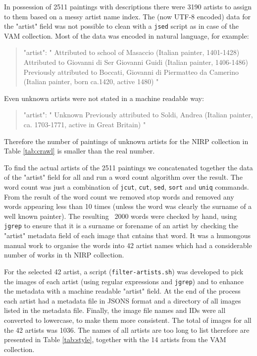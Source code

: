 \documentclass[11pt,a4paper,twoside,openright]{report}
\begin{document}
In possession of 2511 paintings with descriptions there were 3190 artists to
assign to them based on a messy artist name index.  The (now UTF-8 encoded)
data for the "artist" field was not possible to clean with a \texttt{jsed}
script as in case of the VAM collection.  Most of the data was encoded in
natural language, for example:

\begin{quote}
"artist": " Attributed to school of Masaccio (Italian painter, 1401-1428)
Attributed to Giovanni di Ser Giovanni Guidi (Italian painter, 1406-1486)
Previously attributed to Boccati, Giovanni di Piermatteo da Camerino (Italian
painter, born ca.1420, active 1480) "
\end{quote}

Even unknown artists were not stated in a machine readable way:

\begin{quote}
"artist": " Unknown  Previously attributed to Soldi, Andrea (Italian painter,
ca.  1703-1771, active in Great Britain) "
\end{quote}

Therefore the number of paintings of unknown artists for the NIRP collection in
Table \ref{tab:crawl} is smaller than the real number.

To find the actual artists of the 2511 paintings we concatenated together the
data of the "artist" field for all and run a word count algorithm over the
result.  The word count was just a combination of \texttt{jcut}, \texttt{cut},
\texttt{sed}, \texttt{sort} and \texttt{uniq} commands.  From the result of the
word count we removed stop words and removed any words appearing less than 10
times (unless the word was clearly the surname of a well known painter).  The
resulting ~2000 words were checked by hand, using \texttt{jgrep} to ensure that
it is a surname or forename of an artist by checking the "artist" metadata
field of each image that cntains that word.  It was a humongous manual work to
organise the words into 42 artist names which had a considerable number of
works in th NIRP collection.

For the selected 42 artist, a script (\texttt{filter-artists.sh}) was developed
to pick the images of each artist (using regular expressions and
\texttt{jgrep}) and to enhance the metadata with a machine readable "artist"
field.  At the end of the process each artist had a metadata file in JSONS
format and a directory of all images listed in the metadata file.  Finally, the
image file names and IDs were all converted to lowercase, to make them more
consistent.  The total of images for all the 42 artists was 1036.  The names of
all artists are too long to list therefore are presented in Table
\ref{tab:style}, together with the 14 artists from the VAM collection.
\end{document}
